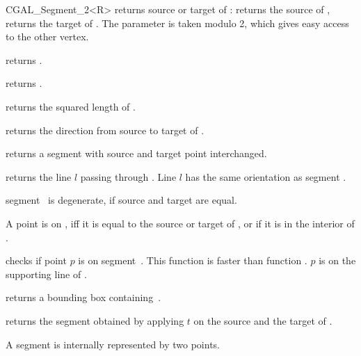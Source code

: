 \begin{ccClassTemplate} {CGAL_Segment_2<R>}
       {returns source or target   of \ccVar:    returns
        the source of \ccVar,  returns the target of \ccVar. 
        The parameter  is taken modulo 2, which gives 
        easy access to the other vertex. }

        {returns .}

       {returns .}

       {returns the squared length of \ccVar. }

       {returns the direction from source to target of \ccVar.}


       {returns a segment with source and target point interchanged.}

       {returns the line $l$ passing through \ccVar. Line $l$  has the
same orientation as segment \ccVar.}

       {segment \ccVar\ is degenerate, if source and target are equal.}

       {}

       {}

       {A point is on \ccVar, iff it is equal to the source or target 
        of \ccVar, or if it is in the interior of \ccVar.}

       {checks if point $p$ is on segment~\ccVar. This function is faster
        than function .
        \ccPrecond $p$ is on the supporting line of \ccVar.}

       {returns a bounding box containing~\ccVar.}

       {returns the segment obtained by applying $t$ on the source
        and the target of \ccVar.}

\ccImplementation
A segment is internally represented by two points. 


\end{ccClassTemplate} 

%
%
%
%

